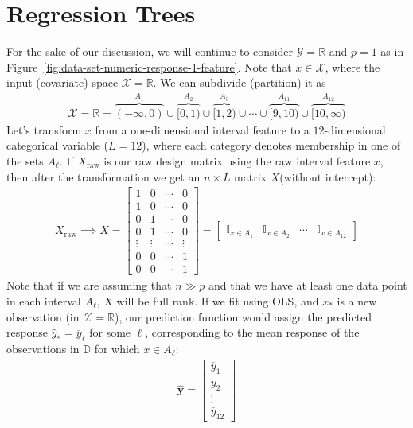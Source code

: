 \documentclass[12pt, a4paper]{article}
\theoremstyle{definition}
\begin{document}
	\section*{Regression Trees}
	For the sake of our discussion, we will continue to consider $\mathcal{Y}=\mathbb{R}$
	and $p=1$ as in Figure~\ref{fig:data-set-numeric-response-1-feature}. Note
	that $x\in \mathcal{X}$, where the input (covariate) space $\mathcal{X} = \mathbb{R}$.
	We can subdivide (partition) it as
	\begin{align*}
		\mathcal{X} = \mathbb{R} =
		\overbrace{(-\infty, 0)}^{A_1} \cup
		\overbrace{[0, 1)}^{A_2} \cup
		\overbrace{[1, 2)}^{A_3} \cup 
		\cdots \cup
		\overbrace{[9, 10)}^{A_{11}} \cup 
		\overbrace{[10, \infty)}^{A_{12}}
	\end{align*}
	Let's transform $x$ from a one-dimensional interval feature to
	a $12$-dimensional categorical variable ($L = 12$), where each category denotes
	membership in one of the sets $A_\ell$. If $X_{\text{raw}}$ is our raw design
	matrix using the raw interval feature $x$, then after the transformation
	we get an $n\times L$ matrix $X$(without intercept):
	\begin{align*}
		X_{\text{raw}}\implies
		X = \begin{bmatrix}
			1 & 0 & \cdots & 0\\
			1 & 0 & \cdots & 0\\
			0 & 1 & \cdots & 0\\
			0 & 1 & \cdots & 0\\
			\vdots& \vdots & \cdots& \vdots\\
			0 & 0 & \cdots& 1\\
			0 & 0 & \cdots & 1
		\end{bmatrix} = \begin{bmatrix}
		\mathbb{I}_{x\in A_1} & \mathbb{I}_{x\in A_2} & \cdots & \mathbb{I}_{x\in A_{12}}
		\end{bmatrix}
	\end{align*}
	Note that if we are assuming that $n \gg p$ and that we have at least one data point in each interval $A_\ell$, $X$ will be full rank. If we fit using OLS, and $x_*$
	is a new observation (in $\mathcal{X}=\mathbb{R}$), our prediction function
	would assign the predicted response $\hat{y}_* = \overline{y}_\ell$ for
	some $\ell$, corresponding to the mean response of the observations in $\mathbb{D}$
	for which $x\in A_\ell$:
	\begin{align*}
		\hat{\bm{y}} = \begin{bmatrix}
			\overline{y}_1\\
			\overline{y}_2\\
			\vdots\\
			\overline{y}_{12}
		\end{bmatrix}
	\end{align*}
\end{document}
